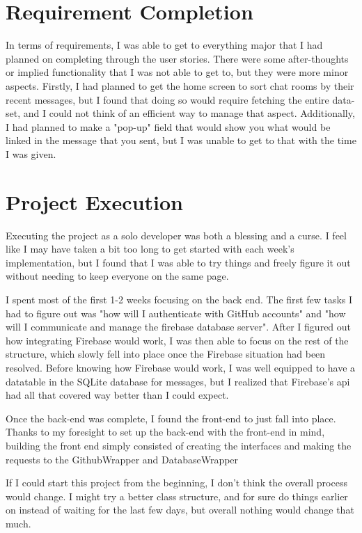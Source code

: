 \documentclass{report}
\begin{document}
\section{Requirement Completion}
In terms of requirements, I was able to get to everything major that I had planned on completing through the user stories. There were some after-thoughts or implied functionality that I was not able to get to, but they were more minor aspects. Firstly, I had planned to get the home screen to sort chat rooms by their recent messages, but I found that doing so would require fetching the entire data-set, and I could not think of an efficient way to manage that aspect. Additionally, I had planned to make a "pop-up" field that would show you what would be linked in the message that you sent, but I was unable to get to that with the time I was given.

\section{Project Execution}
Executing the project as a solo developer was both a blessing and a curse. I feel like I may have taken a bit too long to get started with each week's implementation, but I found that I was able to try things and freely figure it out without needing to keep everyone on the same page.

I spent most of the first 1-2 weeks focusing on the back end. The first few tasks I had to figure out was "how will I authenticate with GitHub accounts" and "how will I communicate and manage the firebase database server". After I figured out how integrating Firebase would work, I was then able to focus on the rest of the structure, which slowly fell into place once the Firebase situation had been resolved. Before knowing how Firebase would work, I was well equipped to have a datatable in the SQLite database for messages, but I realized that Firebase's api had all that covered way better than I could expect.

Once the back-end was complete, I found the front-end to just fall into place. Thanks to my foresight to set up the back-end with the front-end in mind, building the front end simply consisted of creating the interfaces and making the requests to the GithubWrapper and DatabaseWrapper

If I could start this project from the beginning, I don't think the overall process would change. I might try a better class structure, and for sure do things earlier on instead of waiting for the last few days, but overall nothing would change that much.
\end{document}
